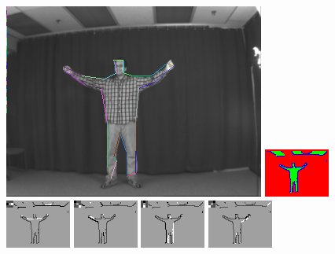 \begin{figure}

\includegraphics[width=0.48 \linewidth]{output/2.detection/local_inference/out.s1.0050.d/thefinalparse.png}
\includegraphics[width=0.48 \linewidth]{output/2.detection/local_inference/out.s1.0050.d/local.x5.interior.png}
\includegraphics[width=0.24 \linewidth]{output/2.detection/local_inference/out.s1.0050.d/local.x5.orientations.0.png}
\includegraphics[width=0.24 \linewidth]{output/2.detection/local_inference/out.s1.0050.d/local.x5.orientations.1.png}
\includegraphics[width=0.24 \linewidth]{output/2.detection/local_inference/out.s1.0050.d/local.x5.orientations.2.png}
\includegraphics[width=0.24 \linewidth]{output/2.detection/local_inference/out.s1.0050.d/local.x5.orientations.3.png}


\end{figure}

